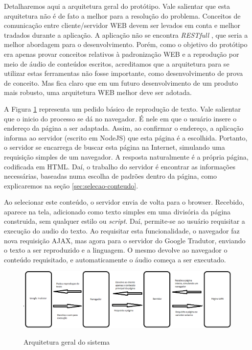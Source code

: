 \documentclass[
	12pt,				%
	oneside,			%
	a4paper,			%
	english,			%
	brazil				%
	]{abntex2ppgsi}
\begin{document}
Detalharemos aqui a arquitetura geral do protótipo. Vale salientar que esta arquitetura não é de fato a melhor para a resolução do problema. Conceitos de comunicação entre cliente/servidor WEB devem ser levados em conta e melhor tradados durante a aplicação. A aplicação não se encontra \textit{RESTfull} \cite{rest}, que seria a melhor abordagem para o desenvolvimento. Porém, como o objetivo do protótipo era apenas provar conceitos relativos à padronização WEB e a reprodução por meio de áudio de conteúdos escritos, acreditamos que a arquitetura para se utilizar estas ferramentas não fosse importante, como desenvolvimento de prova de conceito. Mas fica claro que em um futuro desenvolvimento de um produto mais robusto, uma arquitetura WEB melhor deve ser adotada.

A Figura \ref{fig:figura-sistema} representa um pedido básico de reprodução de texto. Vale salientar que o inicio do processo se dá no navegador. É nele em que o usuário insere o endereço da página a ser adaptada. Assim, ao confirmar o endereço, a aplicação informa ao servidor (escrito em NodeJS) que esta página é a escolhida. Portanto, o servidor se encarrega de buscar esta página na Internet, simulando uma requisição simples de um navegador. A resposta naturalmente é a própria página, codificada em HTML. Daí, o trabalho do servidor é encontrar as informações necessárias, baseadas numa escolha de padrões dentro da página, como explicaremos na seção \ref{sec:selecao-conteudo}. 

Ao selecionar este conteúdo, o servidor envia de volta para o browser. Recebido, aparece na tela, adicionado como texto simples em uma divisória da página construida, sem qualquer estilo ou \textit{script}. Daí, permite-se ao usuário requisitar a execução do audio do texto. Ao requisitar esta funcionalidade, o navegador faz nova requisição AJAX, mas agora para o servidor do Google Tradutor, enviando o texto a ser reproduzido e a linguagem. O mesmo devolve ao navegador o conteúdo requisitado, e automaticamente o áudio começa a ser executado.

\begin{figure}[htbp]
	\centering
	\caption{Arquitetura geral do sistema}
	\includegraphics[scale=0.5]{arquitetura_sistema.png}
	\label{fig:figura-sistema}

\end{figure}
\end{document}
